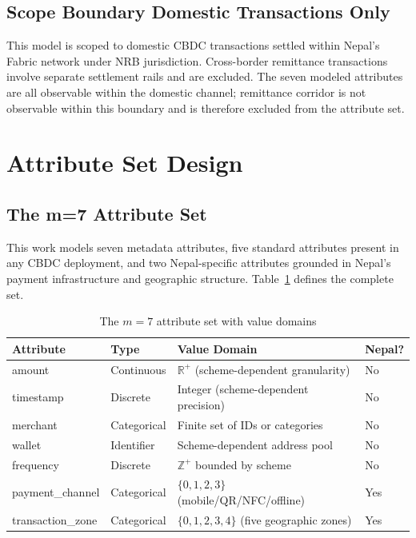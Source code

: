 \subsection{Scope Boundary Domestic Transactions Only}
This model is scoped to domestic CBDC transactions settled
within Nepal's Fabric network under NRB jurisdiction.
Cross-border remittance transactions involve separate
settlement rails and are excluded. The seven modeled
attributes are all observable within the domestic channel;
remittance corridor is not observable within this boundary
and is therefore excluded from the attribute set.

\section{Attribute Set Design}
\label{sec:attribute_design}

\subsection{The m=7 Attribute Set}

This work models seven metadata attributes, five standard
attributes present in any CBDC deployment, and two
Nepal-specific attributes grounded in Nepal's payment
infrastructure and geographic structure.
Table~\ref{tab:attribute_set} defines the complete set.

\begin{table}[H]
\centering
\caption{The $m = 7$ attribute set with value domains}
\label{tab:attribute_set}
\begin{tabular}{llll}
\toprule
\textbf{Attribute} & \textbf{Type} &
\textbf{Value Domain} & \textbf{Nepal?}\\
\midrule
amount    & Continuous  & $\mathbb{R}^+$ (scheme-dependent granularity) & No\\
timestamp & Discrete    & Integer (scheme-dependent precision) & No\\
merchant  & Categorical & Finite set of IDs or categories & No\\
wallet    & Identifier  & Scheme-dependent address pool & No\\
frequency & Discrete    & $\mathbb{Z}^+$ bounded by scheme & No\\
payment\_channel  & Categorical & $\{0,1,2,3\}$ (mobile/QR/NFC/offline) & Yes\\
transaction\_zone & Categorical & $\{0,1,2,3,4\}$ (five geographic zones) & Yes\\
\bottomrule
\end{tabular}
\end{table}


